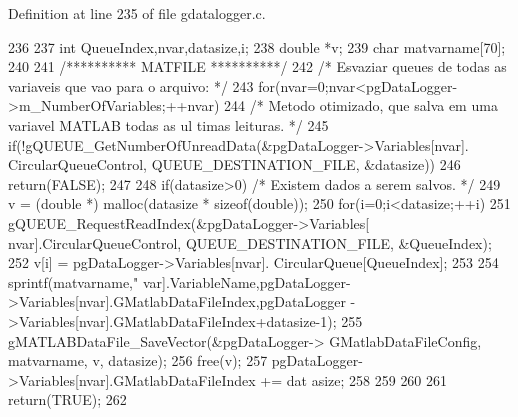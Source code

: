 Definition at line 235 of file gdatalogger.c.


\begin{DoxyCode}
236 {
237         int QueueIndex,nvar,datasize,i;
238         double *v;
239         char matvarname[70];
240 
241         /********** MATFILE **********/
242         /* Esvaziar queues de todas as variaveis que vao para o arquivo: */
243         for(nvar=0;nvar<pgDataLogger->m_NumberOfVariables;++nvar){
244                 /* Metodo otimizado, que salva em uma variavel MATLAB todas as ul
      timas leituras. */
245                 if(!gQUEUE_GetNumberOfUnreadData(&pgDataLogger->Variables[nvar].
      CircularQueueControl, QUEUE_DESTINATION_FILE, &datasize)){
246                         return(FALSE);
247                 }
248                 if(datasize>0){ /* Existem dados a serem salvos. */
249                         v = (double *) malloc(datasize * sizeof(double));
250                         for(i=0;i<datasize;++i){
251                                 gQUEUE_RequestReadIndex(&pgDataLogger->Variables[
      nvar].CircularQueueControl, QUEUE_DESTINATION_FILE, &QueueIndex);
252                                 v[i] = pgDataLogger->Variables[nvar].
      CircularQueue[QueueIndex];
253                         }
254                         sprintf(matvarname,"%
      var].VariableName,pgDataLogger->Variables[nvar].GMatlabDataFileIndex,pgDataLogger
      ->Variables[nvar].GMatlabDataFileIndex+datasize-1);
255                         gMATLABDataFile_SaveVector(&pgDataLogger->
      GMatlabDataFileConfig, matvarname, v, datasize);
256                         free(v);
257                         pgDataLogger->Variables[nvar].GMatlabDataFileIndex += dat
      asize;
258                 }
259         }
260 
261         return(TRUE);
262 }
\end{DoxyCode}
